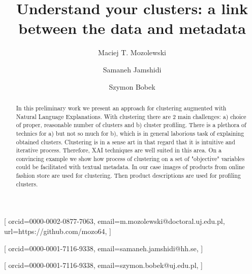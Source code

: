 \documentclass[
 twocolumn,
]{ceurart}
\begin{document}


\title{Understand your clusters: a link between the data and metadata}

\tnotemark[1]

\author[1]{Maciej T. Mozolewski}[%
orcid=0000-0002-0877-7063,
email=m.mozolewski@doctoral.uj.edu.pl,
url=https://github.com/mozo64,
]
\cormark[1]
\fnmark[1]
\address[1]{Jagiellonian University,
  Cracow, Poland}

\author[2]{Samaneh Jamshidi}[%
  orcid=0000-0001-7116-9338,
  email=samaneh.jamshidi@hh.se,
]
\fnmark[1]
\address[2]{Center for Applied Intelligent Systems Research (CAISR), Halmstad University Halmstad, Sweden}

\author[1]{Szymon Bobek}[%
orcid=0000-0001-7116-9338,
email=szymon.bobek@uj.edu.pl,
]
\fnmark[1]


\begin{abstract}
  In this preliminary work we present an approach for clustering augmented with Natural Language Explanations.
  With clustering there are 2 main challenges: a) choice of proper, reasonable number of clusters and b) cluster profiling.
  There is a plethora of technics for a) but not so much for b), which is in general laborious task of explaining obtained clusters.
  Clustering is in a sense art in that regard that it is intuitive and iterative process.
  Therefore, XAI techniques are well suited in this area.
  On a convincing example we show how process of clustering on a set of "objective" variables could be facilitated with textual metadata.
  In our case images of products from online fashion store are used for clustering.
  Then product descriptions are used for profiling clusters.
\end{abstract}
\end{document}
